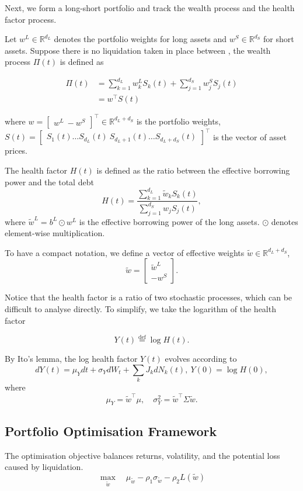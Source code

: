 \documentclass{article} %
\theoremstyle{plain}
\theoremstyle{definition} %
\begin{document}
Next, we form a long-short portfolio and track the wealth process and the health factor process.

Let $w^L \in \mathbb{R}^{d_L}$ denotes the portfolio weights for long assets and $w^S \in \mathbb{R}^{d_S}$ for short assets.
Suppose there is no liquidation taken in place between , the wealth process $\Pi(t)$ is defined as

\begin{align}
\Pi(t) &= \sum_{k=1}^{d_L} w_k^L S_k(t) + \sum_{j=1}^{d_S} w_j^S S_j(t) \\
&= w^\top S(t)
\end{align}

where $w = \begin{bmatrix} w^L \ -w^S \end{bmatrix}^\top \in \mathbb{R}^{d_L + d_S}$ is the portfolio weights,
$S(t) = \begin{bmatrix} S_1(t) \hdots S_{d_L}(t) \ S_{d_L+1}(t) \hdots S_{d_L + d_S}(t) \end{bmatrix}^\top$ is the vector of asset prices.

The health factor $H(t)$ is defined as the ratio between the effective borrowing power and the total debt
\[
H(t) = \frac{\sum_{k=1}^{d_L} \tilde{w}_k S_k(t)}{\sum_{j=1}^{d_S} w_j S_j(t)}, 
\]  
where $\tilde{w}^L = b^L \odot w^L$ is the effective borrowing power of the long assets. $\odot$ denotes element-wise multiplication.

To have a compact notation, we define a vector of effective weights $\tilde{w} \in \mathbb{R}^{d_L + d_S}$, 
\[
\tilde{w} = \begin{bmatrix}\tilde{w}^L \\ -w^S\end{bmatrix}.
\]



Notice that the health factor is a ratio of two stochastic processes, which can be difficult to analyse directly. 
To simplify, we take the logarithm of the health factor 

\[Y(t) \overset{\text{def}}{=}\log H(t). \]

By Ito's lemma, the log health factor $Y(t)$ evolves according to
\[
dY(t) = \mu_Y dt + \sigma_Y dW_t + \sum_k J_k dN_k(t), \ Y(0) = \log H(0),
\]
where
\[
\mu_Y = \tilde{w}^\top \mu, \quad \sigma_Y^2 = \tilde{w}^\top \Sigma \tilde{w}.
\]

\subsection{Portfolio Optimisation Framework}
The optimisation objective balances returns, volatility, and the potential loss caused by liquidation. 
\[
\max_{\tilde{w}} \quad \mu_{\tilde{w}} - \rho_1 \sigma_{\tilde{w}} - \rho_2 L(\tilde{w})
\]
\end{document}
